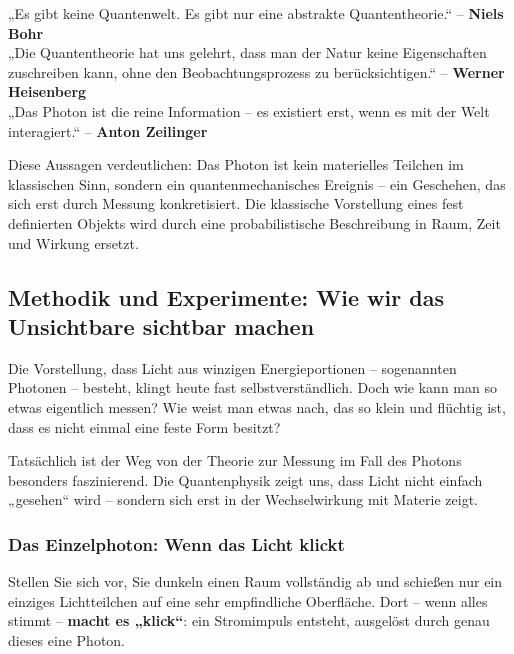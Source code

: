 \vspace{1em}

\begin{tcolorbox}[didaktikbox, title=Was ist Realität in der Quantenphysik?]
	\label{box:realitaet}
	„Es gibt keine Quantenwelt. Es gibt nur eine abstrakte Quantentheorie.“ – \textbf{Niels Bohr} \cite{bohr1933} \\
	„Die Quantentheorie hat uns gelehrt, dass man der Natur keine Eigenschaften zuschreiben kann, ohne den Beobachtungsprozess zu berücksichtigen.“ – \textbf{Werner Heisenberg} \cite{heisenberg1959} \\
	„Das Photon ist die reine Information – es existiert erst, wenn es mit der Welt interagiert.“ – \textbf{Anton Zeilinger} \cite{zeilinger2005}
\end{tcolorbox}

\vspace{1em}

Diese Aussagen verdeutlichen: Das Photon ist kein materielles Teilchen im klassischen Sinn, sondern ein quantenmechanisches Ereignis – ein Geschehen, das sich erst durch Messung konkretisiert. Die klassische Vorstellung eines fest definierten Objekts wird durch eine probabilistische Beschreibung in Raum, Zeit und Wirkung ersetzt.



\subsection{Methodik und Experimente: Wie wir das \newline Unsichtbare sichtbar machen}

Die Vorstellung, dass Licht aus winzigen Energieportionen – sogenannten Photonen – besteht, klingt heute fast selbstverständlich. Doch wie kann man so etwas eigentlich messen? Wie weist man etwas nach, das so klein und flüchtig ist, dass es nicht einmal eine feste Form besitzt?

Tatsächlich ist der Weg von der Theorie zur Messung im Fall des Photons besonders faszinierend. Die Quantenphysik zeigt uns, dass Licht nicht einfach „gesehen“ wird – sondern sich erst in der Wechselwirkung mit Materie zeigt.

\subsubsection{Das Einzelphoton: Wenn das Licht klickt}
Stellen Sie sich vor, Sie dunkeln einen Raum vollständig ab und schießen nur ein einziges Lichtteilchen auf eine sehr empfindliche Oberfläche. Dort – wenn alles stimmt – \textbf{macht es „klick“}: ein Stromimpuls entsteht, ausgelöst durch genau dieses eine Photon.

